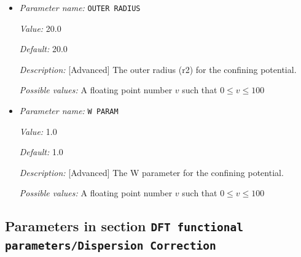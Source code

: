 \begin{itemize}
{\it Description:} [Advanced] The inner radius (r1) for the confining potential.


{\it Possible values:} A floating point number $v$ such that $0 \leq v \leq 100$
\item {\it Parameter name:} {\tt OUTER RADIUS}
\label{parameters:DFT functional parameters/CONFINING POTENTIAL parameters/OUTER RADIUS}
\label{parameters:DFT_20functional_20parameters/CONFINING_20POTENTIAL_20parameters/OUTER_20RADIUS}


{\it Value:} 20.0


{\it Default:} 20.0


{\it Description:} [Advanced] The outer radius (r2) for the confining potential.


{\it Possible values:} A floating point number $v$ such that $0 \leq v \leq 100$
\item {\it Parameter name:} {\tt W PARAM}
\label{parameters:DFT functional parameters/CONFINING POTENTIAL parameters/W PARAM}
\label{parameters:DFT_20functional_20parameters/CONFINING_20POTENTIAL_20parameters/W_20PARAM}


{\it Value:} 1.0


{\it Default:} 1.0


{\it Description:} [Advanced] The W parameter for the confining potential.


{\it Possible values:} A floating point number $v$ such that $0 \leq v \leq 100$
\end{itemize}

\subsection{Parameters in section \tt DFT functional parameters/Dispersion Correction}
\label{parameters:DFT_20functional_20parameters/Dispersion_20Correction}

